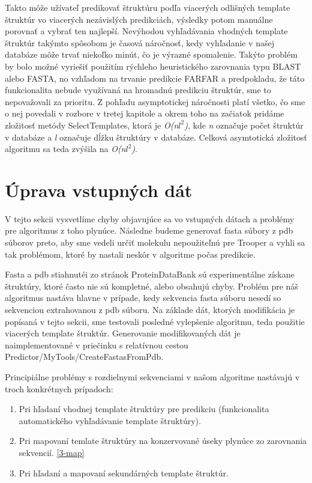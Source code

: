 \indent Takto môže užívateľ predikovať štruktúru podľa viacerých odlišných template štruktúr vo viacerých nezávislých predikciách, výsledky potom manuálne porovnať a vybrať ten najlepší. Nevýhodou vyhľadávania vhodných template štruktúr takýmto spôsobom je časová náročnosť, kedy vyhľadanie v našej databáze  môže trvať niekoľko minút, čo je výrazné spomalenie. Takýto problém by bolo možné vyriešiť použitím rýchleho heuristického zarovnania typu BLAST alebo FASTA, no vzhľadom na trvanie predikcie FARFAR a predpokladu, že táto funkcionalita nebude využívaná na hromadnú predikciu štruktúr, sme to nepovažovali za prioritu. Z pohľadu asymptotickej náročnosti platí všetko, čo sme o nej povedali v rozbore v tretej kapitole a okrem toho na začiatok pridáme zložitosť metódy SelectTemplates, ktorá je \textit{O(n$l^2$)}, kde \textit{n} označuje počet štruktúr v databáze a \textit{l} označuje dĺžku štruktúry v databáze. Celková asymtotická zložitosť algoritmu sa teda zvýšila na \textit{O(n$l^2$)}.




\section{Úprava vstupných dát}
V tejto sekcii vysvetlíme chyby objavujúce sa vo vstupných dátach a problémy pre algoritmus z toho plynúce. Následne budeme generovať fasta súbory z pdb súborov preto, aby sme vedeli určiť molekulu nepoužiteľnú pre Trooper a vyhli sa tak problémom, ktoré by nastali neskôr v algoritme počas predikcie.


\indent Fasta a pdb stiahnutéi zo stránok ProteinDataBank sú experimentálne získane štruktúry, ktoré často nie sú kompletné, alebo obsahujú chyby. Problém pre náš algoritmus nastáva hlavne v prípade, kedy sekvencia fasta súboru nesedí so sekvenciou extrahovanou z pdb súboru. Na základe dát, ktorých modifikácia je popísaná v tejto sekcii, sme testovali posledné vylepšenie algoritmu, teda použitie viacerých template štruktúr. Generovanie modifikovaných dát je naimplementované v priečinku s relatívnou cestou Predictor/MyTools/CreateFastasFromPdb.


\indent Principiálne problémy s rozdielnymi sekvenciami v našom algoritme nastávajú v troch konkrétnych prípadoch: 

\begin{enumerate}
\item Pri hľadaní vhodnej template štruktúry pre predikciu (funkcionalita automatického vyhľadávanie template štruktúry).
\item Pri mapovaní temlate štruktúry na konzervované úseky plynúce zo zarovnania sekvencií. \autoref{3-map}
\item Pri hľadaní a mapovaní sekundárných template štruktúr. 
\end{enumerate}

